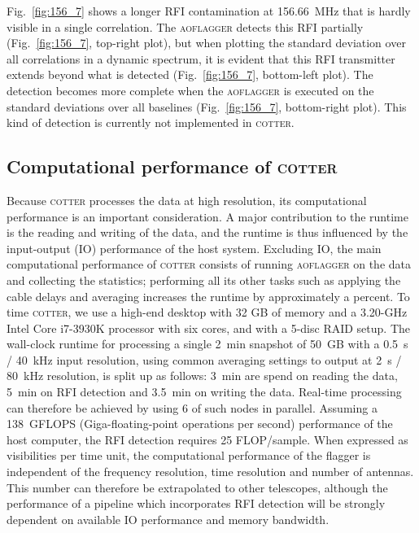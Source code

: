 \documentclass{pasa}
\begin{document}
Fig.~\ref{fig:156_7} shows a longer RFI contamination at 156.66~MHz that is hardly visible in a single correlation. The \textsc{aoflagger} detects this RFI partially (Fig.~\ref{fig:156_7}, top-right plot), but when plotting the standard deviation over all correlations in a dynamic spectrum, it is evident that this RFI transmitter extends beyond what is detected (Fig.~\ref{fig:156_7}, bottom-left plot). The detection becomes more complete when the \textsc{aoflagger} is executed on the standard deviations over all baselines (Fig.~\ref{fig:156_7}, bottom-right plot). This kind of detection is currently not implemented in \textsc{cotter}.

\subsection{Computational performance of \textsc{cotter}}
Because \textsc{cotter} processes the data at high resolution, its computational performance is an important consideration. A major contribution to the runtime is the reading and writing of the data, and the runtime is thus influenced by the input-output (IO) performance of the host system. Excluding IO, the main computational performance of \textsc{cotter} consists of running \textsc{aoflagger} on the data and collecting the statistics; performing all its other tasks such as applying the cable delays and averaging increases the runtime by approximately a percent. To time \textsc{cotter}, we use a high-end desktop with 32 GB of memory and a 3.20-GHz Intel Core i7-3930K processor with six cores, and with a 5-disc RAID setup. The wall-clock runtime for processing a single 2~min snapshot of 50~GB with a 0.5~s / 40~kHz input resolution, using common averaging settings to output at 2~s / 80~kHz resolution, is split up as follows: 3~min are spend on reading the data, 5~min on RFI detection and 3.5~min on writing the data. Real-time processing can therefore be achieved by using 6 of such nodes in parallel. Assuming a 138~GFLOPS (Giga-floating-point operations per second) performance of the host computer, the RFI detection requires 25 FLOP/sample. When expressed as visibilities per time unit, the computational performance of the flagger is independent of the frequency resolution, time resolution and number of antennas. This number can therefore be extrapolated to other telescopes, although the performance of a pipeline which incorporates RFI detection will be strongly dependent on available IO performance and memory bandwidth.
\end{document}
